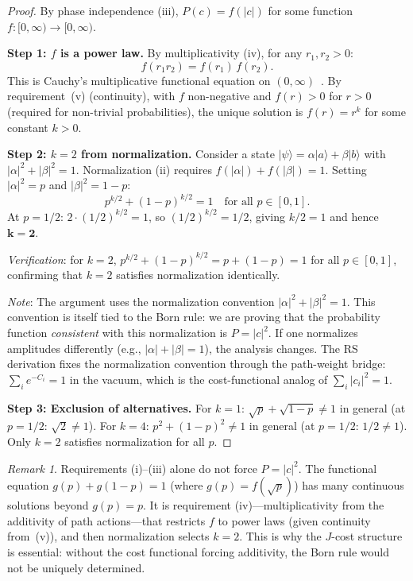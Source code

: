 \documentclass[12pt,a4paper]{article}
\theoremstyle{definition}
\theoremstyle{remark}
\newtheorem{remark}[theorem]{Remark}
\begin{document}
\begin{proof}
By phase independence (iii), $P(c) = f(|c|)$ for some
function $f: [0,\infty) \to [0,\infty)$.

\textbf{Step 1: $f$ is a power law.}
By multiplicativity (iv), for any $r_1, r_2 > 0$:
\begin{equation}
  f(r_1 r_2) = f(r_1)\,f(r_2).
\end{equation}
This is Cauchy's multiplicative functional equation on
$(0,\infty)$~\cite{Aczel1966}.  By requirement~(v)
(continuity), with $f$ non-negative and $f(r) > 0$ for
$r > 0$ (required for non-trivial probabilities), the
unique solution is $f(r) = r^k$ for some constant $k > 0$.

\textbf{Step 2: $k = 2$ from normalization.}
Consider a state $|\psi\rangle = \alpha|a\rangle +
\beta|b\rangle$ with $|\alpha|^2 + |\beta|^2 = 1$.
Normalization (ii) requires
$f(|\alpha|) + f(|\beta|) = 1$.
Setting $|\alpha|^2 = p$ and $|\beta|^2 = 1-p$:
\begin{equation}
  p^{k/2} + (1-p)^{k/2} = 1
  \quad\text{for all } p \in [0,1].
\end{equation}
At $p = 1/2$:
$2 \cdot (1/2)^{k/2} = 1$, so $(1/2)^{k/2} = 1/2$,
giving $k/2 = 1$ and hence $\boldsymbol{k = 2}$.

\emph{Verification}: for $k = 2$, $p^{k/2} + (1-p)^{k/2} =
p + (1-p) = 1$ for all $p \in [0,1]$, confirming that
$k = 2$ satisfies normalization identically. \checkmark

\emph{Note}: The argument uses the normalization convention
$|\alpha|^2 + |\beta|^2 = 1$.  This convention is itself tied to the
Born rule: we are proving that the probability function \emph{consistent}
with this normalization is $P = |c|^2$.  If one normalizes amplitudes
differently (e.g., $|\alpha| + |\beta| = 1$), the analysis changes.
The RS derivation fixes the normalization convention through the path-weight
bridge: $\sum_i e^{-C_i} = 1$ in the vacuum, which is the cost-functional
analog of $\sum_i |c_i|^2 = 1$.

\textbf{Step 3: Exclusion of alternatives.}
For $k = 1$: $\sqrt{p} + \sqrt{1-p} \neq 1$ in general
(at $p = 1/2$: $\sqrt{2} \neq 1$).
For $k = 4$: $p^2 + (1-p)^2 \neq 1$ in general
(at $p = 1/2$: $1/2 \neq 1$).
Only $k = 2$ satisfies normalization for all $p$.
\end{proof}

\begin{remark}
Requirements (i)--(iii) alone do not force $P = |c|^2$.
The functional equation $g(p) + g(1-p) = 1$ (where
$g(p) = f(\sqrt{p})$) has many continuous solutions
beyond $g(p) = p$.  It is requirement (iv)---multiplicativity
from the additivity of path actions---that restricts $f$ to
power laws (given continuity from~(v)), and then normalization
selects $k = 2$.  This is why the $J$-cost structure is
essential: without the cost functional forcing additivity, the
Born rule would not be uniquely determined.
\end{remark}
\end{document}
